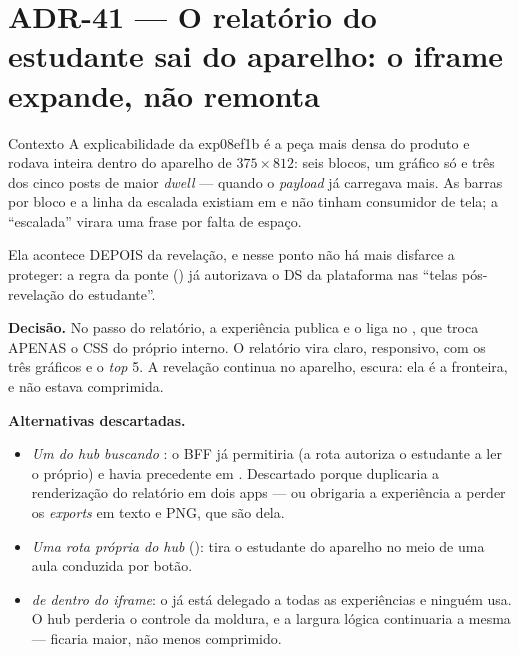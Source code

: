 \section{ADR-41 --- O relatório do estudante sai do aparelho: o iframe expande, não remonta}
\label{adr:relatorio-expandido}

\begin{especificacao}{Contexto}
A explicabilidade da exp08ef1b é a peça mais densa do produto e rodava inteira
dentro do aparelho de $375\times812$: seis blocos, um gráfico só e três dos cinco
posts de maior \emph{dwell} --- quando o \emph{payload} já carregava mais. As
barras por bloco e a linha da escalada existiam em  e não
tinham consumidor de tela; a ``escalada'' virara uma frase por falta de espaço.

Ela acontece DEPOIS da revelação, e nesse ponto não há mais disfarce a proteger:
a regra da ponte () já autorizava o DS da plataforma
nas ``telas pós-revelação do estudante''.
\end{especificacao}

\textbf{Decisão.} No passo do relatório, a experiência publica
 e o
 liga  no , que troca APENAS o
CSS do próprio  interno. O relatório vira claro, responsivo, com os
três gráficos e o \emph{top} 5. A revelação continua no aparelho, escura: ela é
a fronteira, e não estava comprimida.

\textbf{Alternativas descartadas.}
\begin{itemize}
  \item \emph{Um  do hub buscando }:
    o BFF já permitiria (a rota autoriza o estudante a ler o próprio) e havia
    precedente em . Descartado porque duplicaria a
    renderização do relatório em dois apps --- ou obrigaria a experiência a
    perder os \emph{exports} em texto e PNG, que são dela.
  \item \emph{Uma rota própria do hub} (): tira o
    estudante do aparelho no meio de uma aula conduzida por botão.
  \item \emph{ de dentro do \emph{iframe}}: o
     já está delegado a todas as experiências e
    ninguém usa. O hub perderia o controle da moldura, e a largura lógica
    continuaria a mesma --- ficaria maior, não menos comprimido.
\end{itemize}

